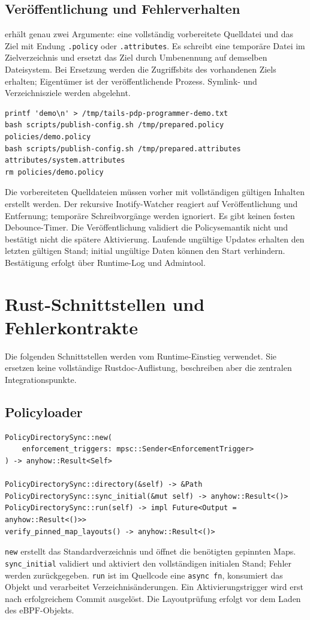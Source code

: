 \documentclass[12pt,a4paper]{article}
\begin{document}
\subsection{Veröffentlichung und Fehlerverhalten}
 erhält genau zwei Argumente: eine vollständig
vorbereitete Quelldatei und das Ziel mit Endung \texttt{.policy} oder
\texttt{.attributes}. Es schreibt eine temporäre Datei im Zielverzeichnis und
ersetzt das Ziel durch Umbenennung auf demselben Dateisystem. Bei Ersetzung werden
die Zugriffsbits des vorhandenen Ziels erhalten; Eigentümer ist der veröffentlichende
Prozess. Symlink- und Verzeichnisziele werden abgelehnt.
\begin{lstlisting}
printf 'demo\n' > /tmp/tails-pdp-programmer-demo.txt
bash scripts/publish-config.sh /tmp/prepared.policy policies/demo.policy
bash scripts/publish-config.sh /tmp/prepared.attributes attributes/system.attributes
rm policies/demo.policy
\end{lstlisting}
Die vorbereiteten Quelldateien müssen vorher mit vollständigen gültigen Inhalten
erstellt werden. Der rekursive Inotify-Watcher reagiert auf Veröffentlichung und
Entfernung; temporäre Schreibvorgänge werden ignoriert. Es gibt keinen festen
Debounce-Timer. Die Veröffentlichung validiert die Policysemantik nicht und
bestätigt nicht die spätere Aktivierung. Laufende ungültige Updates erhalten den
letzten gültigen Stand; initial ungültige Daten können den Start verhindern.
Bestätigung erfolgt über Runtime-Log und Admintool.

\section{Rust-Schnittstellen und Fehlerkontrakte}
Die folgenden Schnittstellen werden vom Runtime-Einstieg verwendet. Sie ersetzen
keine vollständige Rustdoc-Auflistung, beschreiben aber die zentralen Integrationspunkte.
\subsection{Policyloader}
\begin{lstlisting}
PolicyDirectorySync::new(
    enforcement_triggers: mpsc::Sender<EnforcementTrigger>
) -> anyhow::Result<Self>

PolicyDirectorySync::directory(&self) -> &Path
PolicyDirectorySync::sync_initial(&mut self) -> anyhow::Result<()>
PolicyDirectorySync::run(self) -> impl Future<Output = anyhow::Result<()>>
verify_pinned_map_layouts() -> anyhow::Result<()>
\end{lstlisting}
\texttt{new} erstellt das Standardverzeichnis und öffnet die benötigten gepinnten
Maps. \texttt{sync\_initial} validiert und aktiviert den vollständigen initialen
Stand; Fehler werden zurückgegeben. \texttt{run} ist im Quellcode eine
\texttt{async fn}, konsumiert das Objekt und verarbeitet Verzeichnisänderungen.
Ein Aktivierungstrigger wird erst nach erfolgreichem Commit ausgelöst.
Die Layoutprüfung erfolgt vor dem Laden des eBPF-Objekts.
\end{document}
